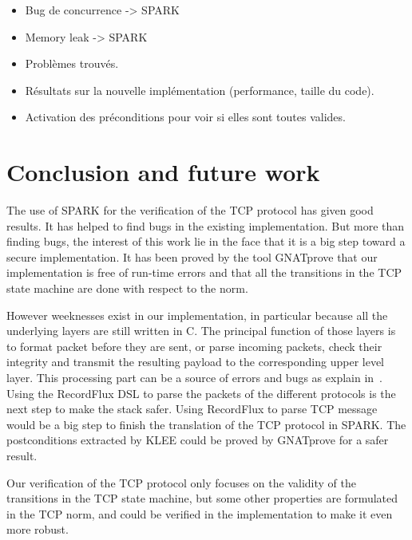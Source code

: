 \documentclass[runningheads]{llncs}
\begin{document}
    \begin{itemize}
        \item Bug de concurrence -> SPARK
        \item Memory leak -> SPARK
        \item Problèmes trouvés.
        \item Résultats sur la nouvelle implémentation (performance, taille du code).
        \item Activation des préconditions pour voir si elles sont toutes valides.
    \end{itemize}



\section{Conclusion and future work}

    The use of SPARK for the verification of the TCP protocol has given good results. It has helped to find bugs
    in the existing implementation. But more than finding bugs, the interest of this work lie in the face that it is
    a big step toward a secure implementation. It has been proved by the tool GNATprove that our implementation is free
    of run-time errors and that all the transitions in the TCP state machine are done with respect to the norm.

    However weeknesses exist in our implementation, in particular because all the underlying layers are still written in C.
    The principal function of those layers is to format packet before they are sent, or parse incoming packets, check
    their integrity and transmit the resulting payload to the corresponding upper level layer.
    This processing part can be a source of errors and bugs as explain in~\cite{Reiher2019RecordFluxFM}.
    Using the RecordFlux DSL to parse the packets of the different protocols is the next step to make the stack safer.
    Using RecordFlux to parse TCP message would be a big step to finish the translation of the TCP protocol in SPARK.
    The postconditions extracted by KLEE could be proved by GNATprove for a safer result.

    Our verification of the TCP protocol only focuses on the validity of the transitions in the TCP state machine,
    but some other properties are formulated in the TCP norm, and could be verified in the implementation to make
    it even more robust.






\end{document}
